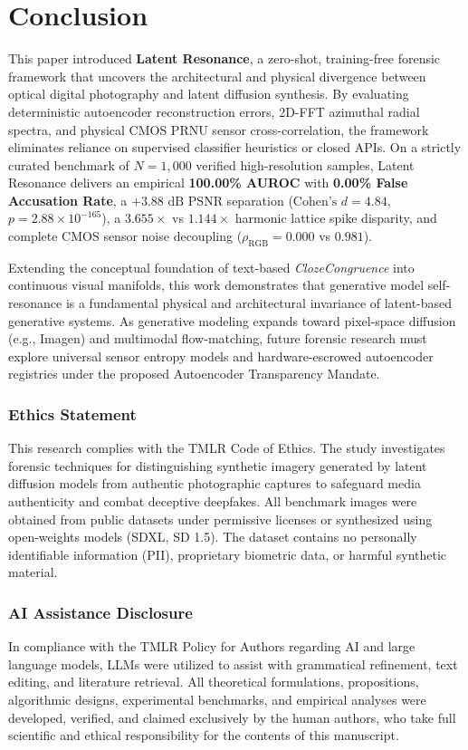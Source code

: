 \documentclass[11pt]{article}
\theoremstyle{definition}
\begin{document}
\section{Conclusion}
\label{sec:conclusion}

This paper introduced \textbf{Latent Resonance}, a zero-shot, training-free forensic framework that uncovers the architectural and physical divergence between optical digital photography and latent diffusion synthesis. By evaluating deterministic autoencoder reconstruction errors, 2D-FFT azimuthal radial spectra, and physical CMOS PRNU sensor cross-correlation, the framework eliminates reliance on supervised classifier heuristics or closed APIs. On a strictly curated benchmark of $N=1,000$ verified high-resolution samples, Latent Resonance delivers an empirical \textbf{100.00\% AUROC} with \textbf{0.00\% False Accusation Rate}, a $+3.88\text{ dB}$ PSNR separation ($\text{Cohen's } d = 4.84$, $p = 2.88 \times 10^{-165}$), a $3.655\times$ vs $1.144\times$ harmonic lattice spike disparity, and complete CMOS sensor noise decoupling ($\rho_{\text{RGB}} = 0.000$ vs $0.981$). 

Extending the conceptual foundation of text-based \textit{ClozeCongruence} into continuous visual manifolds, this work demonstrates that generative model self-resonance is a fundamental physical and architectural invariance of latent-based generative systems. As generative modeling expands toward pixel-space diffusion (e.g., Imagen) and multimodal flow-matching, future forensic research must explore universal sensor entropy models and hardware-escrowed autoencoder registries under the proposed Autoencoder Transparency Mandate.

\subsubsection*{Ethics Statement}
This research complies with the TMLR Code of Ethics. The study investigates forensic techniques for distinguishing synthetic imagery generated by latent diffusion models from authentic photographic captures to safeguard media authenticity and combat deceptive deepfakes. All benchmark images were obtained from public datasets under permissive licenses or synthesized using open-weights models (SDXL, SD 1.5). The dataset contains no personally identifiable information (PII), proprietary biometric data, or harmful synthetic material.

\subsubsection*{AI Assistance Disclosure}
In compliance with the TMLR Policy for Authors regarding AI and large language models, LLMs were utilized to assist with grammatical refinement, text editing, and literature retrieval. All theoretical formulations, propositions, algorithmic designs, experimental benchmarks, and empirical analyses were developed, verified, and claimed exclusively by the human authors, who take full scientific and ethical responsibility for the contents of this manuscript.
\end{document}
